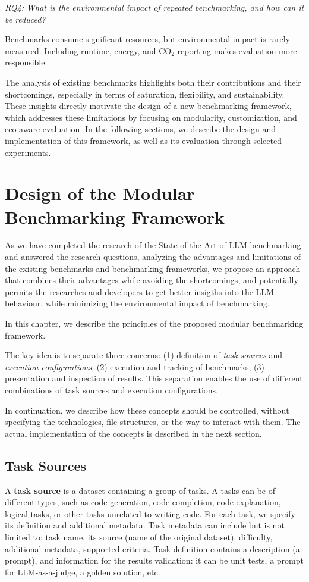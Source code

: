 \textit{RQ4: What is the environmental impact of repeated benchmarking, and how can it be reduced?}

Benchmarks consume significant resources, but environmental impact is rarely measured. Including runtime, energy, and CO$_2$ reporting makes evaluation more responsible.


The analysis of existing benchmarks highlights both their contributions and their shortcomings, especially in terms of saturation, flexibility, and sustainability.
These insights directly motivate the design of a new benchmarking framework, which addresses these limitations by focusing on modularity, customization, and eco-aware evaluation.
In the following sections, we describe the design and implementation of this framework, as well as its evaluation through selected experiments.


\section{Design of the Modular Benchmarking Framework}

As we have completed the research of the State of the Art of LLM benchmarking and answered the research questions,
analyzing the advantages and limitations of the existing benchmarks and benchmarking frameworks,
we propose an approach that combines their advantages while avoiding the shortcomings,
and potentially permits the researches and developers to get better insigths into the LLM behaviour,
while minimizing the environmental impact of benchmarking.

In this chapter, we describe the principles of the proposed modular benchmarking framework.

The key idea is to separate three concerns:
(1) definition of \textit{task sources} and \textit{execution configurations},
(2) execution and tracking of benchmarks,
(3) presentation and inspection of results.
This separation enables the use of different combinations of task sources and execution configurations.

In continuation, we describe how these concepts should be controlled, without specifying the technologies, file structures, or the way to interact with them.
The actual implementation of the concepts is described in the next section.

\subsection{Task Sources}
A \textbf{task source} is a dataset containing a group of tasks.
A tasks can be of different types, such as code generation, code completion, code explanation, logical tasks, or other tasks unrelated to writing code.
For each task, we specify its definition and additional metadata.
Task metadata can include but is not limited to: task name, its source (name of the original dataset), difficulty, additional metadata, supported criteria.
Task definition contains a description (a prompt), and information for the results validation: it can be unit tests, a prompt for LLM-as-a-judge, a golden solution, etc.


